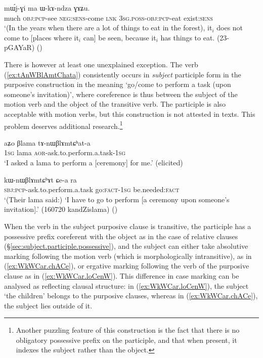 \begin{exe}
	\ex \label{ex:kAmto.mWjGi}
	 mɯ́j-ɣi ma ɯ-kɤ-ndza ɣɤʑu. \\
	much \textsc{obj}:\textsc{pcp}-see \textsc{neg}:\textsc{sens}-come \textsc{lnk} \textsc{3sg}.\textsc{poss}-\textsc{obj}:\textsc{pcp}-eat exist:\textsc{sens} \\
	\glt `(In the years when there are a lot of things to eat in the forest), it$_i$ does not come to [places where it$_i$ can] be seen, because it$_i$ has things to eat. (23-pGAYaR)
()
\end{exe}

There is however at least one unexplained exception. The verb  (\ref{ex:tAnWBlAmtChata}) consistently occurs in \textit{subject} participle form in the purposive construction in the meaning `go/come to perform a task (upon someone's invitation)', where coreference is thus between the subject of the motion verb and the object of the transitive verb. The  participle is also acceptable with motion verbs, but this construction is not attested in texts. This problem deserves additional research.\footnote{Another puzzling feature of this construction is the fact that there is no obligatory possessive prefix on the participle, and that when present, it indexes the subject rather than the object. }

\begin{exe}
	\ex \label{ex:tAnWBlAmtChata}
	\gll aʑo βlama  tɤ-nɯβlɤmtɕʰat-a \\
	\textsc{1sg} lama \textsc{aor}-ask.to.perform.a.task-\textsc{1sg} \\
	\glt `I asked a lama to perform a [ceremony] for me.' (elicited)
\end{exe}

\begin{exe}
	\ex \label{ex:kWnWBlAmtChAt.Cea}
	\gll kɯ-nɯβlɤmtɕʰɤt ɕe-a ra \\
	\textsc{sbj}:\textsc{pcp}-ask.to.perform.a.task go:\textsc{fact}-\textsc{1sg} be.needed:\textsc{fact} \\
	\glt `(Their lama said:) `I have to go to perform [a ceremony upon someone's invitation].' (160720 kandZislama)
	()
\end{exe}

When the verb in the subject purposive clause is transitive, the participle has a possessive prefix coreferent with the object as in the case of relative clauses (§\ref{sec:subject.participle.possessive}), and the subject can either take absolutive marking following the motion verb (which is morphologically intransitive), as in (\ref{ex:WkWCar.chACe}), or ergative marking following the verb of the purposive clause as in (\ref{ex:WkWCar.loCenW}). This difference in case marking can be analysed as reflecting clausal structure: in (\ref{ex:WkWCar.loCenW}), the subject  `the children' belongs to the purposive clauses, whereas in (\ref{ex:WkWCar.chACe}), the subject  lies outside of it.


